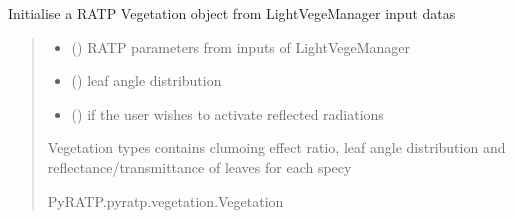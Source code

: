 \documentclass[letterpaper,10pt,english]{sphinxmanual}
\begin{document}
\begin{fulllineitems}
\label{\detokenize{reference:RATPinputs.RATP_vegetation}}
\pysigstartsignatures
{}
\pysigstopsignatures
\sphinxAtStartPar
Initialise a RATP Vegetation object from LightVegeManager input datas
\begin{quote}\begin{description}
\begin{itemize}
\item {} 
\sphinxAtStartPar
{} () \textendash{} RATP parameters from inputs of LightVegeManager

\item {} 
\sphinxAtStartPar
{} () \textendash{} leaf angle distribution

\item {} 
\sphinxAtStartPar
{} () \textendash{} if the user wishes to activate reflected radiations

\end{itemize}

\sphinxAtStartPar
Vegetation types contains clumoing effect ratio, leaf angle distribution and reflectance/transmittance of leaves for each specy

\sphinxAtStartPar
PyRATP.pyratp.vegetation.Vegetation

\end{description}\end{quote}

\end{fulllineitems}

\end{document}
